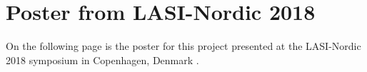 \documentclass[../Main/thesis.tex]{subfiles}
\begin{document}
\chapter{Poster from LASI-Nordic 2018}
\label{app:lasi-poster}
On the following page is the poster for this project presented at the LASI-Nordic 2018 symposium in Copenhagen, Denmark \citep{Wake2018}. 


\end{document}

